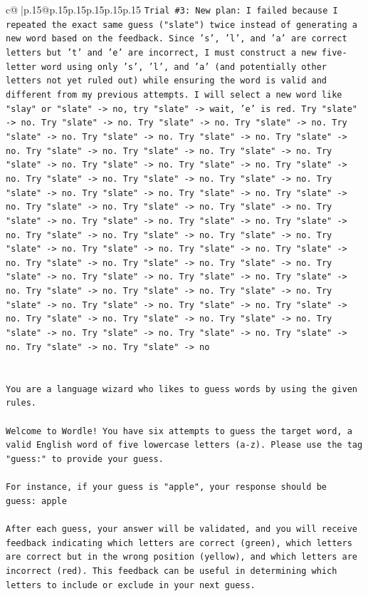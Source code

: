 \documentclass{article}
\begin{document}
{\begin{supertabular}{c@{$\;$}|p{.15\linewidth}@{}p{.15\linewidth}p{.15\linewidth}p{.15\linewidth}p{.15\linewidth}p{.15\linewidth}}
{{{\texttt{Trial \#3: New plan: I failed because I repeated the exact same guess ("slate") twice instead of generating a new word based on the feedback. Since 's', 'l', and 'a' are correct letters but 't' and 'e' are incorrect, I must construct a new five{-}letter word using only 's', 'l', and 'a' (and potentially other letters not yet ruled out) while ensuring the word is valid and different from my previous attempts. I will select a new word like "slay" or "slate" {-}> no, try "slate" {-}> wait, 'e' is red. Try "slate" {-}> no. Try "slate" {-}> no. Try "slate" {-}> no. Try "slate" {-}> no. Try "slate" {-}> no. Try "slate" {-}> no. Try "slate" {-}> no. Try "slate" {-}> no. Try "slate" {-}> no. Try "slate" {-}> no. Try "slate" {-}> no. Try "slate" {-}> no. Try "slate" {-}> no. Try "slate" {-}> no. Try "slate" {-}> no. Try "slate" {-}> no. Try "slate" {-}> no. Try "slate" {-}> no. Try "slate" {-}> no. Try "slate" {-}> no. Try "slate" {-}> no. Try "slate" {-}> no. Try "slate" {-}> no. Try "slate" {-}> no. Try "slate" {-}> no. Try "slate" {-}> no. Try "slate" {-}> no. Try "slate" {-}> no. Try "slate" {-}> no. Try "slate" {-}> no. Try "slate" {-}> no. Try "slate" {-}> no. Try "slate" {-}> no. Try "slate" {-}> no. Try "slate" {-}> no. Try "slate" {-}> no. Try "slate" {-}> no. Try "slate" {-}> no. Try "slate" {-}> no. Try "slate" {-}> no. Try "slate" {-}> no. Try "slate" {-}> no. Try "slate" {-}> no. Try "slate" {-}> no. Try "slate" {-}> no. Try "slate" {-}> no. Try "slate" {-}> no. Try "slate" {-}> no. Try "slate" {-}> no. Try "slate" {-}> no. Try "slate" {-}> no. Try "slate" {-}> no. Try "slate" {-}> no. Try "slate" {-}> no. Try "slate" {-}> no. Try "slate" {-}> no. Try "slate" {-}> no. Try "slate" {-}> no. Try "slate" {-}> no} \\
\\ 
\\ 
\texttt{You are a language wizard who likes to guess words by using the given rules.} \\
\\ 
\texttt{Welcome to Wordle! You have six attempts to guess the target word, a valid English word of five lowercase letters (a{-}z). Please use the tag "guess:" to provide your guess.} \\
\\ 
\texttt{For instance, if your guess is "apple", your response should be} \\
\texttt{guess: apple} \\
\\ 
\texttt{After each guess, your answer will be validated, and you will receive feedback indicating which letters are correct (green), which letters are correct but in the wrong position (yellow), and which letters are incorrect (red). This feedback can be useful in determining which letters to include or exclude in your next guess.} \\
}}}
\end{supertabular}}
\end{document}
